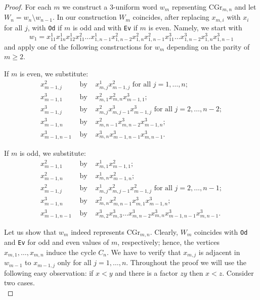 \documentclass[11pt]{article}
\begin{document}
\begin{proof}
For each $m$ we construct a 3-uniform word $w_m$ reprsenting $\mbox{CGr}_{m,n}$ and let $W_n=w_n\setminus w_{n-1}$. In our construction $W_m$ coincides, after replacing $x_{m,i}$ with  $x_i$ for all $j$, with \texttt{Od} if $m$ is odd and with \texttt{Ev} if $m$ is even. Namely, we start with
$$w_1=x_{11}^1x_{1n}^1x_{12}^1x_{11}^2\ldots x_{1,n-1}^1x_{1,n-2}^2x_{1,n}^2x_{1,n-1}^2x_{11}^3\ldots x_{1,n-2}^3x_{1,n}^3x_{1,n-1}^3$$
and apply one of the following constructions for $w_m$ depending on the parity of $m\ge 2$. 

If $m$ is even, we substitute:
\begin{eqnarray*}
x_{m-1,j}^2 & \mbox{ by } & x_{m,j}^1x_{m-1,j}^2  \mbox{ for all } j=1,\ldots,n;\\
x_{m-1,1}^3 & \mbox{ by } & x_{m,1}^2x_{m,n}^2x_{m-1,1}^3; \\
x_{m-1,j}^3 & \mbox{ by } & x_{m,j}^2x_{m,j-1}^3x_{m-1,j}^3 \mbox{ for all } j=2,\ldots,n-2;\\
x_{m-1,n}^3 & \mbox{ by } & x_{m,n-1}^2x_{m,n-2}^3x_{m-1,n}^3;\\
x_{m-1,n-1}^3 & \mbox{ by } & x_{m,n}^3x_{m-1,n-1}^3x_{m,n-1}^3.
\end{eqnarray*}

If $m$ is odd, we substitute:
\begin{eqnarray*}
x_{m-1,1}^2 & \mbox{ by } & x_{m,1}^1x_{m-1,1}^2;\\
x_{m-1,n}^2 & \mbox{ by } & x_{m,n}^1x_{m-1,n}^2 ;\\
x_{m-1,j}^2 & \mbox{ by } & x_{m,j}^1x_{m,j-1}^2x_{m-1,j}^2 \mbox{ for all } j=2,\ldots,n-1;\\
x_{m-1,n}^3 & \mbox{ by } & x_{m,n}^2x_{m,n-1}^2x_{m,1}^3x_{m-1,n}^3;\\
x_{m-1,n-1}^3 & \mbox{ by } & x_{m,2}^3x_{m,3}^3\ldots x_{m,n-2}^3x_{m,n}^3x_{m-1,n-1}^3x_{m,n-1}^3.
\end{eqnarray*}

Let us show that $w_m$ indeed represents $\mathrm{CGr}_{m,n}$. Clearly, $W_m$ coincides with \texttt{Od} and \texttt{Ev} for odd and even values of $m$, respectively; hence, the vertices $x_{m,1}, \ldots, x_{m,n}$ induce the cycle $C_n$. We have to verify that $x_{m,j}$ is adjacent in $w_{m-1}$ to  $x_{m-1,j}$ only for all $ j=1,\ldots,n$. 
Throughout the proof we will use the following easy observation: if $x<y$ and there is a factor $zy$ then $x<z$.
Consider two cases. \\[-3mm]


\end{proof}
\end{document}
